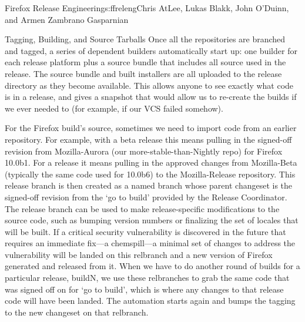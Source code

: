 \begin{aosachapter}{Firefox Release Engineering}{s:ffreleng}{Chris AtLee, Lukas Blakk, John O'Duinn, and Armen Zambrano Gasparnian}
\begin{aosasect1}{Tagging, Building, and Source Tarballs}
Once all the repositories are branched and tagged, a series of dependent builders
automatically start up: one builder for each release platform plus a
source bundle that includes all source used in the release.  The source
bundle and built installers are all uploaded to the release directory
as they become available.  This allows anyone to see exactly what code
is in a release, and gives a snapshot that would allow us to re-create
the builds if we ever needed to (for example, if our VCS failed somehow).
 
For the Firefox build's source, sometimes we need to import code
from an earlier repository. For example, with a beta release this means
pulling in the signed-off revision from Mozilla-Aurora (our
more-stable-than-Nightly repo) for Firefox 10.0b1. For a release it
means pulling in the approved changes from Mozilla-Beta (typically the
same code used for 10.0b6) to the Mozilla-Release repository.  This release
branch is then created as a named branch whose parent changeset is
the signed-off revision from the `go to build' provided by the Release
Coordinator. The release branch can be used to make release-specific
modifications to the source code, such as bumping version numbers or
finalizing the set of locales that will be built. If a critical
security vulnerability is discovered in the future that requires an
immediate fix---a chemspill---a minimal set of changes to
address the vulnerability will be landed on this relbranch and a new
version of Firefox generated and released from it. When we have to do another round of
builds for a particular release, buildN, we use these relbranches to
grab the same code that was signed off on for `go to build', which is
where any changes to that release code will have been landed. The
automation starts again and bumps the tagging to the new changeset on
that relbranch.
    

\end{aosasect1}
\end{aosachapter}
